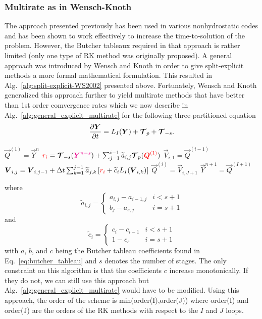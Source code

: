 \documentclass{report}
\begin{document}
{\subsubsection{Multirate as in Wensch-Knoth}
The approach presented previously has been used in various nonhydrostatic codes and has been shown to work effectively to increase the time-to-solution of the problem.  However, the Butcher tableaux required in that approach is rather limited (only one type of RK method was originally proposed).  A general approach was introduced by Wensch and Knoth in order to give split-explicit methods a more formal mathematical formulation.  This resulted in Alg.\ \ref{alg:split-explicit-WS2002} presented above.  Fortunately, Wensch and Knoth generalized this approach further to yield multirate methods that have better than 1st order comvergence rates which we now describe in Alg.\ \ref{alg:general_explicit_multirate} for the following three-partitioned equation
\[
\frac{\partial \boldsymbol{{Y}}}{\partial t}= L_I(\boldsymbol{{Y}}) +  \boldsymbol{{\mathcal{T}}}_{p} + \boldsymbol{{\mathcal{T}}}_{-s}.
\]
\begin{algorithm}
\label{alg:general_explicit_multirate}
\begin{algorithmic}
\State
{}
\State $\vec{Q}^{(1)}=\vec{Y}^n$ 
\State $\textcolor{red}{r_i}=\boldsymbol{{\mathcal{T}}}_{-s}(\textcolor{magenta}{ \boldsymbol{{Y}}^{n-s}}) + \sum_{j=1}^{i-1} \widetilde{a}_{i,j} \boldsymbol{{\mathcal{T}}}_{p}(\textcolor{red}{\boldsymbol{{Q}}^{(1)}})$
\State $\vec{V}_{i,1}=\vec{Q}^{(i-1)}$
\State $\boldsymbol{{V}}_{i,j}=\boldsymbol{{V}}_{i,j-1} + \Delta t \sum_{k=1}^{j-1} \widetilde{a}_{j,k} \left[ \textcolor{red}{r_i} + \widetilde{c}_{i} L_I(\boldsymbol{{V}}_{i,k}) \right]$ 
\EndFor %
\State $\vec{Q}^{(i)}=\vec{V}_{i,J+1}$
\EndFor %
\State $\vec{Y}^{n+1}=\vec{Q}^{(I+1)}$
\EndFunction
\end{algorithmic}
\end{algorithm}
where 
\[
\widetilde{a}_{i,j}=\left\{
\begin{array}{cc}
  {a}_{i,j}-{a}_{i-1,j}   &  i < s+1 \\
  {b}_{j}-{a}_{s,j}   &  i = s+1  
\end{array}
\right.
\]
and
\[
\widetilde{c}_{i}=\left\{
\begin{array}{cc}
  {c}_{i}-{c}_{i-1}   &  i < s+1 \\
  1-{c}_{s}   &  i = s+1  
\end{array}
\right.
\]
with $a$, $b$, and $c$ being the Butcher tableau coefficients found in Eq.\ \eqref{eq:butcher_tableau} and $s$ denotes the number of stages.  The only constraint on this algorithm is that the coefficients $c$ increase monotonically. If they do not, we can still use this approach but Alg.\ \ref{alg:general_explicit_multirate} would have to be modified.  Using this approach, the order of the scheme is min(order(I),order(J)) where  order(I) and order(J) are the orders of the RK methods with respect to the $I$ and $J$ loops.

}
\end{document}
